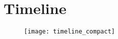 \chapter{Timeline}

\begin{figure}[htbp]
	\texttt{[image: timeline\_compact]}
	\centering
    \label{timeline_compact}
\end{figure}